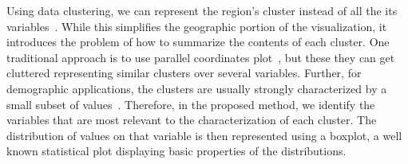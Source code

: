 Using data clustering, we can represent the region's cluster instead of all the
its variables~\cite{Alce2018,Valdivia2015,VonLandesberger2016}. While this
simplifies the geographic portion of the visualization, it introduces the
problem of how to summarize the contents of each cluster. One traditional
approach is to use parallel coordinates
plot~\cite{ferreira2015urbane,LI2018,johansson2005revealing,guo2006visualization},
but these they can get cluttered representing similar clusters over several
variables. Further, for demographic applications, the clusters are usually
strongly characterized by a small subset of
values~\cite{Delmelle2016,Delmelle2017}. Therefore, in the proposed method, we
identify the variables that are most relevant to the characterization of each
cluster. The distribution of values on that variable is then represented using a
boxplot, a well known statistical plot displaying basic properties of the
distributions.